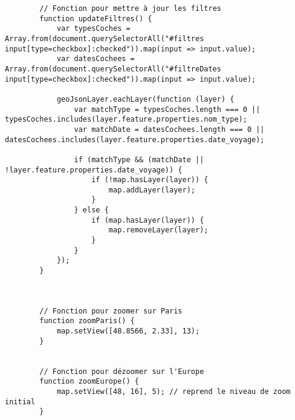 \begin{verbatim}
        // Fonction pour mettre à jour les filtres 
        function updateFiltres() {
            var typesCoches = Array.from(document.querySelectorAll("#filtres input[type=checkbox]:checked")).map(input => input.value);
            var datesCochees = Array.from(document.querySelectorAll("#filtreDates input[type=checkbox]:checked")).map(input => input.value);

            geoJsonLayer.eachLayer(function (layer) {
                var matchType = typesCoches.length === 0 || typesCoches.includes(layer.feature.properties.nom_type);
                var matchDate = datesCochees.length === 0 || datesCochees.includes(layer.feature.properties.date_voyage);

                if (matchType && (matchDate || !layer.feature.properties.date_voyage)) {
                    if (!map.hasLayer(layer)) {
                        map.addLayer(layer);
                    }
                } else {
                    if (map.hasLayer(layer)) {
                        map.removeLayer(layer);
                    }
                }
            });
        }
      


        // Fonction pour zoomer sur Paris
        function zoomParis() {
            map.setView([48.8566, 2.33], 13);
        }


        // Fonction pour dézoomer sur l'Europe
        function zoomEurope() {
            map.setView([48, 16], 5); // reprend le niveau de zoom initial
        }
\end{verbatim}